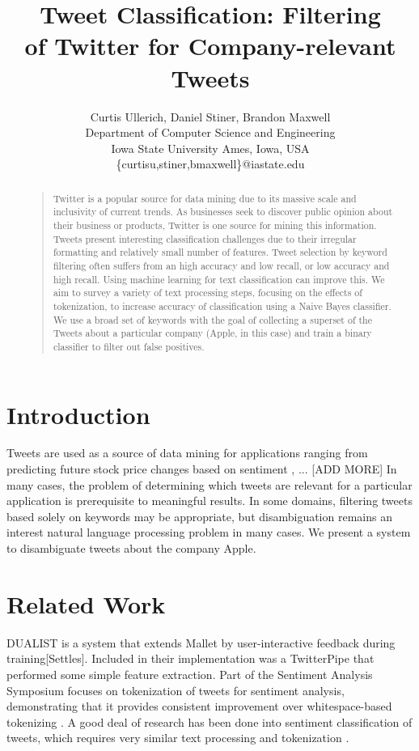 \documentclass[letterpaper]{article}
\begin{document}
\title{Tweet Classification: Filtering \\ of Twitter for Company-relevant Tweets}
\author{
Curtis Ullerich, Daniel Stiner, Brandon Maxwell\\
Department of Computer Science and Engineering\\
Iowa State University
Ames, Iowa, USA\\
\{curtisu,stiner,bmaxwell\}@iastate.edu\\
}
\maketitle
\begin{abstract}
\begin{quote}
Twitter is a popular source for data mining due to its massive scale and inclusivity of current trends. As businesses seek to discover public opinion about their business or products, Twitter is one source for mining this information. Tweets present interesting classification challenges due to their irregular formatting and relatively small number of features. Tweet selection by keyword filtering often suffers from an high accuracy and low recall, or low accuracy and high recall. Using machine learning for text classification can improve this. We aim to survey a variety of text processing steps, focusing on the effects of tokenization, to increase accuracy of classification using a Naive Bayes classifier. We use a broad set of keywords with the goal of collecting a superset of the Tweets about a particular company (Apple, in this case) and train a binary classifier to filter out false positives.
\end{quote}
\end{abstract}

\section{Introduction}
Tweets are used as a source of data mining for applications ranging from predicting future stock price changes based on sentiment \cite{Ruiz:2012:CFT:2124295.2124358}, ... [ADD MORE]
In many cases, the problem of determining which tweets are relevant for a particular application is prerequisite to meaningful results. In some domains, filtering tweets based solely on keywords may be appropriate, but disambiguation remains an interest natural language processing problem in many cases. We present a system to disambiguate tweets about the company Apple.

\section{Related Work}
DUALIST is a system that extends Mallet by user-interactive feedback during training[Settles]. Included in their implementation was a TwitterPipe that performed some simple feature extraction. 
Part of the Sentiment Analysis Symposium focuses on tokenization of tweets for sentiment analysis, demonstrating that it provides consistent improvement over whitespace-based tokenizing \cite{potts2011}. A good deal of research has been done into sentiment classification of tweets, which requires very similar text processing and tokenization \cite{Pak10}. 
\end{document}
